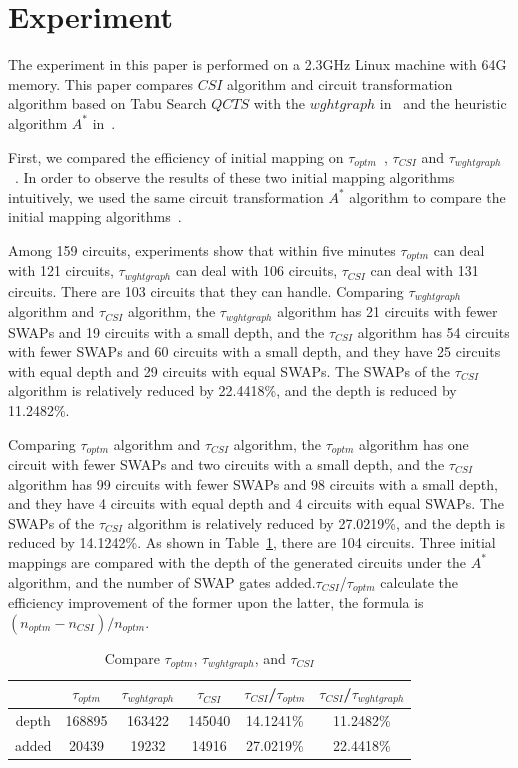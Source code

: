 \documentclass[runningheads]{llncs}
\begin{document}
\section{Experiment}
\label{Experiment}
The experiment in this paper is performed on a 2.3GHz Linux machine with 64G memory. This paper compares  $CSI$  algorithm 
and circuit transformation algorithm based on Tabu Search $QCTS$ with the $wghtgraph$ in~\cite{2020Qubit} and the heuristic algorithm $ A^{*}$  in~\cite{Zulehner2017}.
 
First, we compared the efficiency of initial mapping on $\tau_{optm}$~\cite{Zulehner2017},  $\tau_{CSI}$ and $\tau_{wghtgraph}$~\cite{2020Qubit}. In order to observe the results of these two initial mapping algorithms intuitively, we used the same circuit transformation $ A^{*}$ algorithm to compare the initial mapping algorithms~\cite{Zulehner2017}.

Among 159 circuits, experiments show that within five minutes $\tau_{optm}$ can deal with 121 circuits, $\tau_{wghtgraph}$  can deal with 106 circuits, $\tau_{CSI}$  can deal with  131 circuits. There are 103 circuits that they can handle. Comparing $\tau_{wghtgraph}$ algorithm and $\tau_{CSI}$ algorithm, the $\tau_{wghtgraph}$ algorithm has 21 circuits with fewer SWAPs and 19 circuits with a small depth, and the $\tau_{CSI}$ algorithm has 54 circuits with fewer SWAPs and 60 circuits with a small depth, and they have 25 circuits with equal depth and  29 circuits with equal SWAPs. The SWAPs of the $\tau_{CSI}$ algorithm is relatively reduced by 22.4418\%, 
and the depth is reduced by 11.2482\%.

Comparing $\tau_{optm}$ algorithm and $\tau_{CSI}$ algorithm, the $\tau_{optm}$ algorithm has one circuit with fewer SWAPs and two circuits with a small depth, and the $\tau_{CSI}$ algorithm has 99 circuits with fewer SWAPs and 98 circuits with a small depth, 
and they have 4 circuits with equal depth and 4 circuits with equal SWAPs. The SWAPs of the $\tau_{CSI}$ algorithm is relatively reduced by 27.0219\%, and the depth is reduced by 14.1242\%. As shown in Table~\ref{tab1}, there are 104 circuits. Three initial mappings are compared with the depth of the generated circuits under the $A^{*}$ algorithm, and the number of SWAP gates added.$\tau_{CSI}$/$\tau_{optm}$  calculate the efficiency improvement of the former upon the latter, the formula is $(n_{optm}-n_{CSI})/n_{optm}$.
\begin{table}
	\begin{center}  
	\begin{tabular}{|c|c|c|c|c|c|}
	\hline
	    	&  $\tau_{optm}$ & $\tau_{wghtgraph}$ &$\tau_{CSI}$& $\tau_{CSI}$/$\tau_{optm}$ & $\tau_{CSI}$/$\tau_{wghtgraph}$\\
	\hline
	 depth 	 &	168895	&   163422	&  145040 	& 14.1241\%  &11.2482\%   \\
	\hline
	 added 	&	20439	&  19232 	&  14916 & 27.0219\% 	&  22.4418\%  \\
	\hline
	\end{tabular} 
	\end{center} 
	\caption{Compare $\tau_{optm}$, $\tau_{wghtgraph}$, and $\tau_{CSI}$ }
	\label{tab1}
	\end{table}
\end{document}
